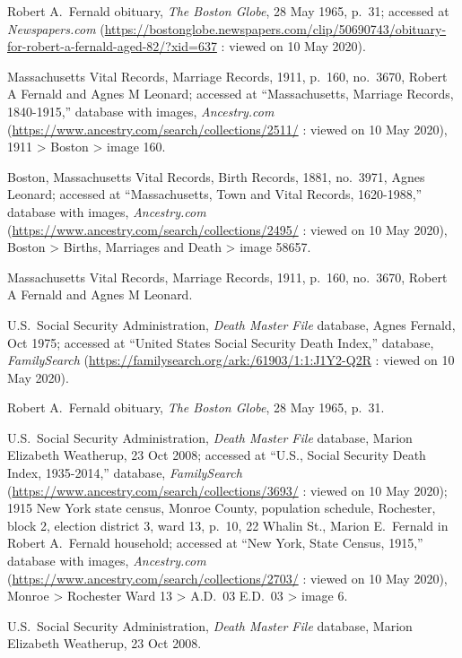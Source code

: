 \begin{thebibliography}{999}
Robert A.\ Fernald obituary, \textit{The Boston Globe}, 28 May 1965, p.\ 31; accessed at \textit{Newspapers.com} (\url{https://bostonglobe.newspapers.com/clip/50690743/obituary-for-robert-a-fernald-aged-82/?xid=637} : viewed on 10 May 2020).

Massachusetts Vital Records, Marriage Records, 1911, p.\ 160, no.\ 3670, Robert A Fernald and Agnes M Leonard; accessed at ``Massachusetts, Marriage Records, 1840-1915,'' database with images, \textit{Ancestry.com} (\url{https://www.ancestry.com/search/collections/2511/} : viewed on 10 May 2020), 1911 > Boston > image 160.

Boston, Massachusetts Vital Records, Birth Records, 1881, no.\ 3971, Agnes Leonard; accessed at ``Massachusetts, Town and Vital Records, 1620-1988,'' database with images, \textit{Ancestry.com} (\url{https://www.ancestry.com/search/collections/2495/} : viewed on 10 May 2020), Boston > Births, Marriages and Death > image 58657.

Massachusetts Vital Records, Marriage Records, 1911, p.\ 160, no.\ 3670, Robert A Fernald and Agnes M Leonard.

U.S.\ Social Security Administration, \textit{Death Master File} database, Agnes Fernald, Oct 1975; accessed at ``United States Social Security Death Index,'' database, \textit{FamilySearch} (\url{https://familysearch.org/ark:/61903/1:1:J1Y2-Q2R} : viewed on 10 May 2020).

Robert A.\ Fernald obituary, \textit{The Boston Globe}, 28 May 1965, p.\ 31.

U.S.\ Social Security Administration, \textit{Death Master File} database, Marion Elizabeth Weatherup, 23 Oct 2008; accessed at ``U.S., Social Security Death Index, 1935-2014,'' database, \textit{FamilySearch} (\url{https://www.ancestry.com/search/collections/3693/} : viewed on 10 May 2020); 1915 New York state census, Monroe County, population schedule, Rochester, block 2, election district 3, ward 13, p.\ 10, 22 Whalin St., Marion E.\ Fernald in Robert A.\ Fernald household; accessed at ``New York, State Census, 1915,'' database with images, \textit{Ancestry.com} (\url{https://www.ancestry.com/search/collections/2703/} : viewed on 10 May 2020), Monroe > Rochester Ward 13 > A.D.\ 03 E.D.\ 03 > image 6.

U.S.\ Social Security Administration, \textit{Death Master File} database, Marion Elizabeth Weatherup, 23 Oct 2008.


\end{thebibliography}
